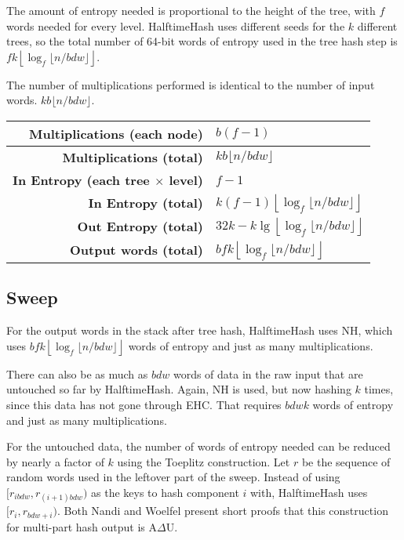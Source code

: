 \documentclass[runningheads]{llncs}
\begin{document}

The amount of entropy needed is proportional to the height of the tree, with $f$ words needed for every level.
HalftimeHash uses different seeds for the $k$ different trees, so the total number of 64-bit words of entropy used in the tree hash step is $f k\left\lfloor\log_f \lfloor n/b d w\rfloor\right\rfloor$.

The number of multiplications performed is identical to the number of input words. $k b \lfloor n / b d w \rfloor$.

\begin{tabular}{|r|l|}
    \hline {\bf Multiplications (each node)} & $b (f-1)$ \\
    \hline {\bf Multiplications (total)} & $k b \lfloor n / b d w \rfloor$ \\
    \hline {\bf In Entropy (each tree $\times$ level)} & $f-1$ \\
    \hline {\bf In Entropy (total)} & $k (f-1) \left\lfloor \log_f \lfloor n / b d w \rfloor \right\rfloor$ \\
    \hline {\bf Out Entropy (total)} & $32k - k\lg\left\lfloor\log_f \lfloor n/b d w\rfloor\right\rfloor$\\
    \hline {\bf Output words (total)} & $b f k \left\lfloor \log_f \lfloor n / b d w \rfloor \right\rfloor$\\
    \hline
\end{tabular}


\subsection{Sweep}

For the output words in the stack after tree hash, HalftimeHash uses NH, which uses $b f k \left\lfloor \log_f \lfloor n / b d w \rfloor \right\rfloor$ words of entropy and just as many multiplications.

There can also be as much as $b d w$ words of data in the raw input that are untouched so far by HalftimeHash.
Again, NH is used, but now hashing $k$ times, since this data has not gone through EHC.
That requires $b d w k$ words of entropy and just as many multiplications.

For the untouched data, the number of words of entropy needed can be reduced by nearly a factor of $k$ using the Toeplitz construction.
Let $r$ be the sequence of random words used in the leftover part of the sweep.
Instead of using $[r_{i b d w}, r_{(i+1)b d w})$ as the keys to hash component $i$ with, HalftimeHash uses $[r_{i}, r_{b d w + i})$.
Both Nandi and Woelfel present short proofs that this construction for multi-part hash output is A$\Delta$U. \cite{ehc-nandi,woelfel-toeplitz}
\end{document}
